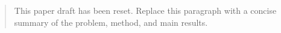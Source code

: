 \begin{abstract}
This paper draft has been reset. Replace this paragraph with a concise summary of the problem, method, and main results.
\end{abstract}
